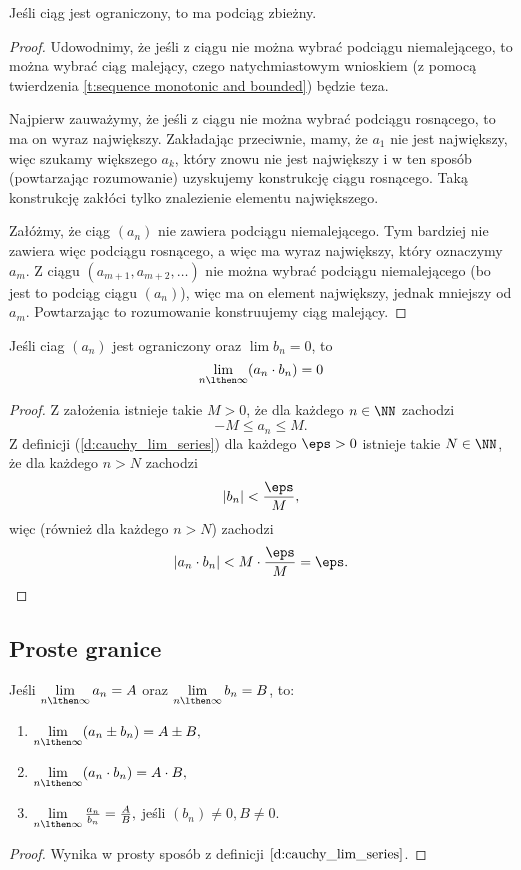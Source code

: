 \begin{theorem}
    Jeśli ciąg jest ograniczony, to ma podciąg zbieżny.
\end{theorem}
\begin{proof}
    Udowodnimy, że jeśli z ciągu nie można wybrać podciągu niemalejącego, to można wybrać ciąg malejący, czego natychmiastowym wnioskiem (z pomocą twierdzenia \ref{t:sequence monotonic and bounded}) będzie teza.

    Najpierw zauważymy, że jeśli z ciągu nie można wybrać podciągu rosnącego, to ma on wyraz największy. Zakładając przeciwnie, mamy, że $a_1$ nie jest największy, więc szukamy większego $a_k$, który znowu nie jest największy i w ten sposób (powtarzając rozumowanie) uzyskujemy konstrukcję ciągu rosnącego. Taką konstrukcję zakłóci tylko znalezienie elementu największego.

    Załóżmy, że ciąg $(a_n)$ nie zawiera podciągu niemalejącego. Tym bardziej nie zawiera więc podciągu rosnącego, a więc ma wyraz największy, który oznaczymy $a_m$. Z ciągu $(a_{m+1}, a_{m+2}, \ldots)$ nie można wybrać podciągu niemalejącego (bo jest to podciąg ciągu $(a_n)$), więc ma on element największy, jednak mniejszy od $a_m$. Powtarzając to rozumowanie konstruujemy ciąg malejący.
\end{proof}

\begin{theorem}
    \label{t:sequence bounded and convergent to 0}
    Jeśli ciag $(a_n)$ jest ograniczony oraz $\lim b_n = 0$, to
    \[ \lim_{n \lthen \infty} (a_n \cdot b_n) = 0 \]
\end{theorem}
\begin{proof}
    Z założenia istnieje takie $M > 0$, że dla każdego $n \in \NN$ zachodzi
    \[ -M \leq a_n \leq M. \]
    Z definicji (\ref{d:cauchy_lim_series}) dla każdego $\eps > 0$ istnieje takie $N \in \NN$, że dla każdego $n > N$ zachodzi
    \[ |b_n| < \frac{\eps}{M}, \]
    więc (również dla każdego $n > N$) zachodzi
    \[ |a_n \cdot b_n| < M \cdot \frac{\eps}{M} = \eps. \]
\end{proof}

\subsection{Proste granice}
\begin{theorem}
    Jeśli $\lim\limits_{n \lthen \infty} a_n = A$ oraz $\lim\limits_{n \lthen \infty} b_n = B$, to:
    \begin{enumerate}
        \item $\lim\limits_{n \lthen \infty} (a_n \pm b_n) = A \pm B,$
        \item $\lim\limits_{n \lthen \infty} (a_n \cdot b_n) = A \cdot B,$
        \item $\lim\limits_{n \lthen \infty} \frac{a_n}{b_n} = \frac{A}{B},$ jeśli $(b_n) \neq 0, B \neq 0$.
    \end{enumerate}
\end{theorem}
\begin{proof}
    Wynika w prosty sposób z definicji $\ref{d:cauchy_lim_series}$.
\end{proof}

